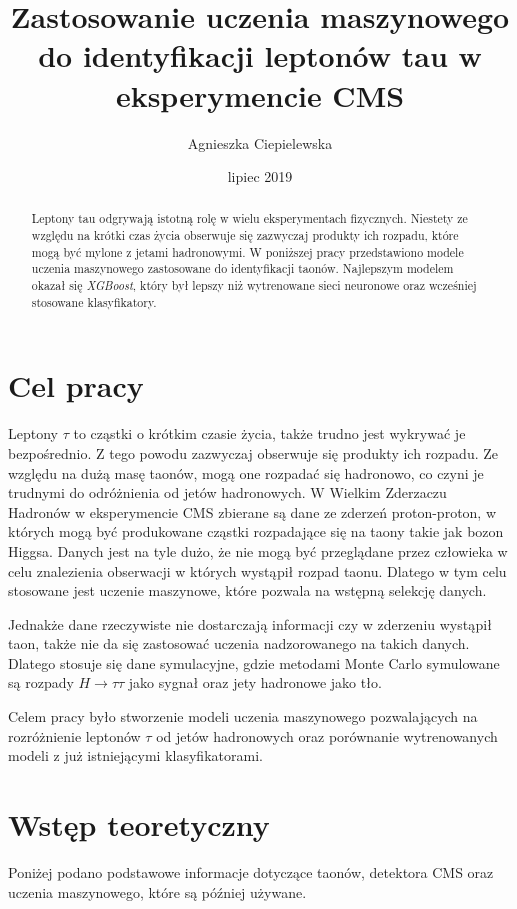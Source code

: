 \documentclass{pracalicmgr}
\author{Agnieszka Ciepielewska}
\title{Zastosowanie uczenia maszynowego do identyfikacji leptonów tau w eksperymencie CMS}
\date{lipiec 2019}
\begin{document}
    \maketitle
    \let\cleardoublepage\clearpage
    
    \begin{abstract}
    Leptony tau	odgrywają istotną rolę w wielu eksperymentach fizycznych. Niestety ze względu na krótki czas życia obserwuje się zazwyczaj produkty ich rozpadu, które mogą być mylone z jetami hadronowymi. W poniższej pracy przedstawiono modele uczenia maszynowego zastosowane do identyfikacji taonów. Najlepszym modelem okazał się \textit{XGBoost}, który był lepszy niż wytrenowane sieci neuronowe oraz wcześniej stosowane klasyfikatory.

    \end{abstract}

    \tableofcontents
    
    \chapter*{Cel pracy}
    Leptony $\tau$ to cząstki o krótkim czasie życia, także trudno jest wykrywać je bezpośrednio. Z tego powodu zazwyczaj obserwuje się produkty ich rozpadu. Ze względu na dużą masę taonów, mogą one rozpadać się hadronowo, co czyni je trudnymi do odróżnienia od jetów hadronowych. W Wielkim Zderzaczu Hadronów w eksperymencie CMS zbierane są dane ze zderzeń proton-proton, w których mogą być produkowane cząstki rozpadające się na taony takie jak bozon Higgsa. Danych jest na tyle dużo, że nie mogą być przeglądane przez człowieka w celu znalezienia obserwacji w których wystąpił rozpad taonu. Dlatego w tym celu stosowane jest uczenie maszynowe, które pozwala na wstępną selekcję danych.
    
    Jednakże dane rzeczywiste nie dostarczają informacji czy w zderzeniu wystąpił taon, także nie da się zastosować uczenia nadzorowanego na takich danych. Dlatego stosuje się dane symulacyjne, gdzie metodami Monte Carlo symulowane są rozpady $H \rightarrow \tau\tau$ jako sygnał oraz jety hadronowe jako tło.
    
    Celem pracy było stworzenie modeli uczenia maszynowego pozwalających na rozróżnienie leptonów $\tau$ od jetów hadronowych oraz porównanie wytrenowanych modeli z już istniejącymi klasyfikatorami.
    
    \chapter{Wstęp teoretyczny}
    \label{ch:wstep}
	Poniżej podano podstawowe informacje dotyczące taonów, detektora CMS oraz uczenia maszynowego, które są później używane.
\end{document}
